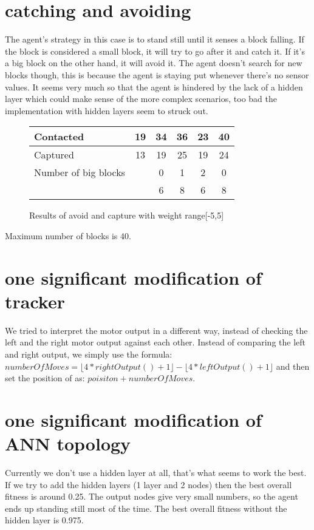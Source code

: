 \documentclass[12pt, a4paper]{article}
\begin{document}
\section{catching and avoiding}
The agent's strategy in this case is to stand still until it senses a block falling. If the block is considered a small block, it will try to go after it and catch it. If it's a big block on the other hand, it will avoid it. The agent doesn't search for new blocks though, this is because the agent is staying put whenever there's no sensor values. It seems very much so that the agent is hindered by the lack of a hidden layer which could make sense of the more complex scenarios, too bad the implementation with hidden layers seem to struck out. 
\begin{figure}[H]
	\begin{center}
		\begin{tabular}{l | c | c |c |c |c }
		 Contacted& 19 & 34 & 36 & 23 & 40\\ \hline
		 Captured & 13 & 19 & 25 & 19 & 24\\ \hline
		Number of big blocks & & 0& 1 & 2 &0 \\
		 & & 6 & 8 & 6 & 8\\
		\end{tabular}
	\end{center}
	\caption{Results of avoid and capture with weight range[-5,5]}
\end{figure}
Maximum number of blocks is 40.

\section{one significant modification of tracker}
We tried to interpret the motor output in a different way, instead of checking the left and the right motor output against each other. Instead of comparing the left and right output, we simply use the formula:\\ $numberOfMoves = \lfloor 4*rightOutput()+1 \rfloor - \lfloor 4*leftOutput()+1 \rfloor$
and then set the position of as: $ poisiton + numberOfMoves $.

\section{one significant modification of ANN topology}
Currently we don't use a hidden layer at all, that's what seems to work the best. If we try to add the hidden layers (1 layer and 2 nodes) then the best overall fitness is around 0.25. The output nodes give very small numbers, so the agent ends up standing still most of the time. The best overall fitness without the hidden layer is 0.975. 
\end{document}

